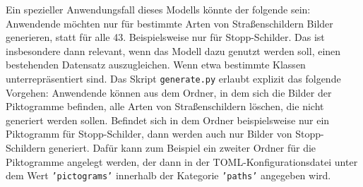 Ein spezieller Anwendungsfall dieses Modells könnte der folgende sein: Anwendende möchten nur für bestimmte Arten von Straßenschildern Bilder generieren, statt für alle 43. Beispielsweise nur für Stopp-Schilder. Das ist insbesondere dann relevant, wenn das Modell dazu genutzt werden soll, einen bestehenden Datensatz auszugleichen. Wenn etwa bestimmte Klassen unterrepräsentiert sind.
Das Skript \texttt{generate.py} erlaubt explizit das folgende Vorgehen: Anwendende können aus dem Ordner, in dem sich die Bilder der Piktogramme befinden, alle Arten von Straßenschildern löschen, die nicht generiert werden sollen. Befindet sich in dem Ordner beispielsweise nur ein Piktogramm für Stopp-Schilder, dann werden auch nur Bilder von Stopp-Schildern generiert. Dafür kann zum Beispiel ein zweiter Ordner für die Piktogramme angelegt werden, der dann in der \ac{TOML}-Konfigurationsdatei unter dem Wert \texttt{'pictograms'} innerhalb der Kategorie \texttt{'paths'} angegeben wird.